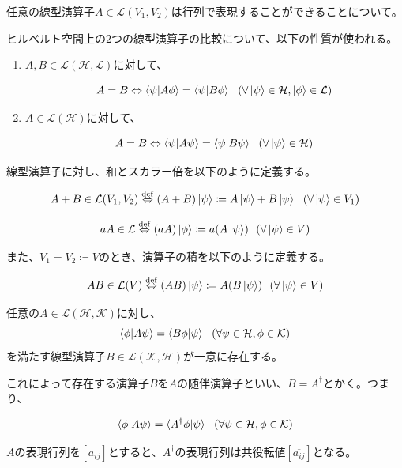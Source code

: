 \begin{Memo}
  任意の線型演算子$A\in \mathcal{L}(V_1,V_2)$は行列で表現することができることについて。
\end{Memo}

ヒルベルト空間上の$2$つの線型演算子の比較について、以下の性質が使われる。
\begin{Prop}
  \begin{enumerate}
    \item $A,B\in\mathcal{L}(\mathcal{H},\mathcal{L})$に対して、

    $$
      A=B \Leftrightarrow \braket{\psi|A\phi} = \braket{\psi|B\phi}~~(\forall \ket{\psi}\in \mathcal{H},\ket{\phi}\in\mathcal{L})
    $$

    \item $A\in\mathcal{L}(\mathcal{H})$に対して、

    $$
      A=B \Leftrightarrow \braket{\psi|A\psi} = \braket{\psi|B\psi}~~(\forall \ket{\psi}\in \mathcal{H})
    $$
  \end{enumerate}
\end{Prop}


\begin{Def}
  線型演算子に対し、和とスカラー倍を以下のように定義する。

  $$
    A+B \in \mathcal{L}(V_1,V_2) \overset{\mathrm{def}}{\Leftrightarrow} (A+B)\ket{\psi} \coloneqq A\ket{\psi} + B\ket{\psi}~~(\forall \ket{\psi} \in V_1)
  $$

  $$
    aA\in \mathcal{L} \overset{\mathrm{def}}{\Leftrightarrow} (aA)\ket{\phi} \coloneqq a(A\ket{\psi})~~(\forall \ket{\psi} \in V)
  $$
\end{Def}

\begin{Def}
  また、$V_1 = V_2 \coloneqq V$のとき、演算子の積を以下のように定義する。

  $$
    AB \in \mathcal{L}(V) \overset{\mathrm{def}}{\Leftrightarrow} (AB)\ket{\psi} \coloneqq A(B\ket{\psi})~~(\forall \ket{\psi} \in V)
  $$
\end{Def}

\begin{Meidai}
  任意の$A\in\mathcal{L}(\mathcal{H},\mathcal{K})$に対し、
  $$
    \braket{\phi|A\psi} = \braket{B\phi|\psi}~~(\forall \psi\in\mathcal{H},\phi\in\mathcal{K})
  $$
  を満たす線型演算子$B\in\mathcal{L}(\mathcal{K},\mathcal{H})$が一意に存在する。

  これによって存在する演算子$B$を$A$の随伴演算子といい、$B=A^\dagger$とかく。つまり、

  $$
    \braket{\phi|A\psi} = \braket{A^\dagger\phi|\psi}~~(\forall \psi\in\mathcal{H},\phi\in\mathcal{K})
  $$
\end{Meidai}
$A$の表現行列を$[a_{ij}]$とすると、$A^\dagger$の表現行列は共役転値$[\overline{a_{ij}}]$となる。

